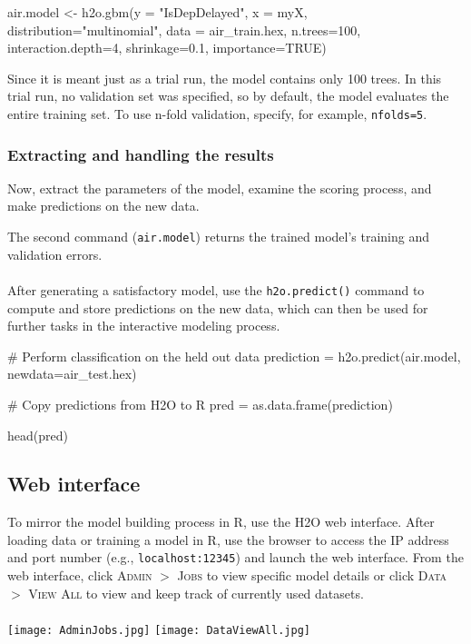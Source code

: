 \documentclass[11pt]{article}
\begin{document}
{\begin{spverbatim}
air.model <- h2o.gbm(y = "IsDepDelayed", x = myX, 
                   distribution="multinomial", 
                   data = air_train.hex, n.trees=100, 
                   interaction.depth=4, 
                   shrinkage=0.1,
                   importance=TRUE)
                   
\end{spverbatim}
\noindent
Since it is meant just as a trial run, the model contains only 100 trees. In this trial run, no validation set was specified, so by default, the model evaluates the entire training set.  To use n-fold validation, specify, for example, \texttt{nfolds=5}. 

\subsubsection{Extracting and handling the results}  

Now, extract the parameters of the model, examine the scoring process, and make predictions on the new data.

\noindent
The second command ({\texttt{air.model}}) returns the trained model's training and validation errors. 
\\
\\
After generating a satisfactory model, use the \texttt{h2o.predict()} command to compute and store predictions on the new data, which can then be used for further tasks in the interactive modeling process.
\begin{spverbatim}
# Perform classification on the held out data
prediction = h2o.predict(air.model, newdata=air_test.hex)

# Copy predictions from H2O to R
pred = as.data.frame(prediction)

head(pred)

\end{spverbatim}


\subsection{Web interface} 

To mirror the model building process in R, use the H2O web interface. After loading data or training a model in R, use the browser to access the IP address and port number (e.g., {\texttt{localhost:12345}}) and launch the web interface. From the web interface, click  \textsc{Admin} $>$ \textsc{Jobs} to view specific model details or click  \textsc{Data} $>$ \textsc{View All} to view and keep track of currently used datasets. 
\\
\\
\texttt{[image: AdminJobs.jpg]} \texttt{[image: DataViewAll.jpg]}

}
\end{document}
